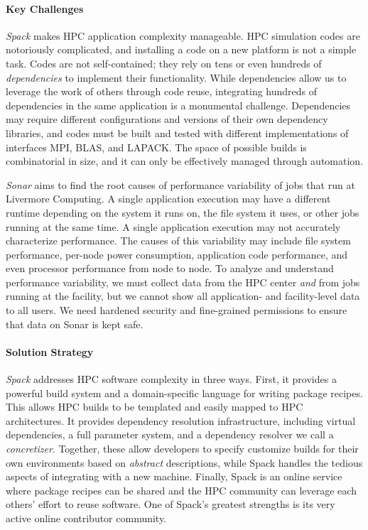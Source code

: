 \paragraph{Key  Challenges}
{\it Spack} makes HPC application complexity manageable. HPC simulation
codes are notoriously complicated, and installing a code on a new
platform is not a simple task.  Codes are not self-contained; they rely
on tens or even hundreds of {\it dependencies} to implement their
functionality. While dependencies allow us to leverage the work of others
through code reuse, integrating hundreds of dependencies in the same
application is a monumental challenge.  Dependencies may require
different configurations and versions of their own dependency libraries,
and codes must be built and tested with different implementations of
interfaces MPI, BLAS, and LAPACK. The space of possible builds is
combinatorial in size, and it can only be effectively managed through
automation.

{\it Sonar} aims to find the root causes of performance variability of
jobs that run at Livermore Computing.  A single application execution may
have a different runtime depending on the system it runs on, the file
system it uses, or other jobs running at the same time.  A single
application execution may not accurately characterize performance.  The
causes of this variability may include file system performance, per-node
power consumption, application code performance, and even processor
performance from node to node. To analyze and understand performance
variability, we must collect data from the HPC center {\it and} from jobs
running at the facility, but we cannot show all application- and
facility-level data to all users. We need hardened security and
fine-grained permissions to ensure that data on Sonar is kept safe.


\paragraph{Solution Strategy}
{\it Spack} addresses HPC software complexity in three ways. First, it
provides a powerful build system and a domain-specific language for
writing package recipes.  This allows HPC builds to be templated and
easily mapped to HPC architectures. It provides dependency resolution
infrastructure, including virtual dependencies, a full parameter system,
and a dependency resolver we call a {\it concretizer}. Together, these
allow developers to specify customize builds for their own environments
based on {\it abstract} descriptions, while Spack handles the tedious
aspects of integrating with a new machine. Finally, Spack is an online
service where package recipes can be shared and the HPC community can
leverage each others' effort to reuse software. One of Spack's greatest
strengths is its very active online contributor community.

